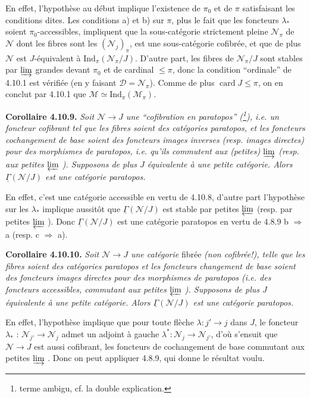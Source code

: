 \documentclass[11pt]{article}
\newcommand{\printedpage}[1]{\marginpar{\footnotesize p.~#1}}
\newcommand{\msp}[1]{\marginpar{\footnotesize [#1]}}
\newcommand{\Ind}{\mathrm{Ind}}
\newcommand{\uGamma}{\underline{\Gamma}}
\begin{document}
En effet, l'hypothèse au début implique l'existence de $\pi_0$ et de $\pi$ satisfaisant les conditions dites. Les conditions a) et b) sur $\pi$, plus le fait que les foncteurs $\lambda_*$ soient $\pi_0$-accessibles, impliquent que la sous-catégorie strictement pleine $\mathcal{N}_\pi$ de $\mathcal{N}$ dont les fibres sont les $(\mathcal{N}_j)_\pi$, est une sous-catégorie cofibrée, et que de plus $\mathcal{N}$ est $J$-équivalent à $\Ind_\pi(\mathcal{N}_\pi/J)$. D'autre part, les fibres de $\mathcal{N}_\pi/J$ sont stables par $\varinjlim$ grandes devant $\pi_0$ et de cardinal $\leqslant \pi$, donc la condition “ordinale” de 4.10.1 est vérifiée (en y faisant $\mathcal{D} = \mathcal{N}_\pi$). Comme de plus $\operatorname{card} J \leqslant \pi$, on en conclut par 4.10.1 que $\mathcal{M} \simeq \Ind_\pi(\mathcal{M}_\pi)$.

\msp{page 265}

\textbf{Corollaire 4.10.9.} \textit{Soit $\mathcal{N} \longrightarrow J$ une “cofibration en paratopos” (\footnote{terme ambigu, cf. la double explication.}), i.e. un foncteur cofibrant tel que les fibres soient des catégories paratopos, et les foncteurs cochangement de base soient des foncteurs images inverses (resp. images directes) pour des morphismes de paratopos, i.e. qu'ils commutent aux (petites) $\varinjlim$ (resp. aux petites $\varprojlim$ ). Supposons de plus $J$ équivalente à une petite catégorie. Alors $\uGamma(\mathcal{N}/J)$ est une catégorie paratopos.}

En effet, c'est une catégorie accessible en vertu de 4.10.8, d'autre part l'hypothèse sur les $\lambda_*$ implique aussitôt que $\uGamma(\mathcal{N}/J)$ est stable par petites $\varprojlim$ (resp. par petites $\varprojlim$
\printedpage{100}
). Donc $\uGamma(\mathcal{N}/J)$ est une catégorie paratopos en vertu de 4.8.9 b $\Longrightarrow$ a (resp. c $\Longrightarrow$ a).

\textbf{Corollaire 4.10.10.} \textit{Soit $\mathcal{N} \longrightarrow J$ une catégorie} fibrée \textit{(non cofibrée!), telle que les fibres soient des catégories paratopos et les foncteurs} \msp{page 266} \textit{changement de base soient des foncteurs images directes pour des morphismes de paratopos (i.e. des foncteurs accessibles, commutant aux petites $\varprojlim$ ). Supposons de plus $J$ équivalente à une petite catégorie. Alors $\uGamma(\mathcal{N}/J)$ est une catégorie paratopos.}

En effet, l'hypothèse implique que pour toute flèche $\lambda : j' \longrightarrow j$ dans $J$, le foncteur $\lambda_*$ : $\mathcal{N}_{j'} \longrightarrow \mathcal{N}_j$ admet un adjoint à gauche $\lambda^* : \mathcal{N}_j \longrightarrow \mathcal{N}_{j'}$, d'où s'ensuit que $\mathcal{N} \longrightarrow J$ est aussi cofibrant, les foncteurs de cochangement de base commutant aux petites $\varinjlim$ . Donc on peut appliquer 4.8.9, qui donne le résultat voulu.
\end{document}
